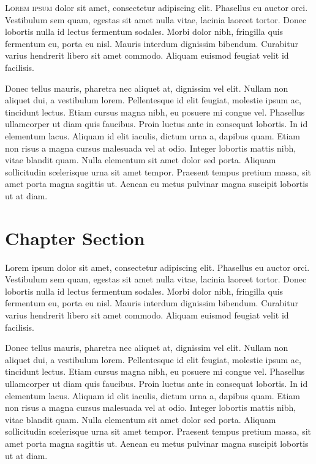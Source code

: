 \lettrine[lines=3]{L}{orem ipsum} dolor sit amet, consectetur adipiscing elit. Phasellus eu auctor orci. Vestibulum sem quam, egestas sit amet nulla vitae, lacinia laoreet tortor. Donec lobortis nulla id lectus fermentum sodales. Morbi dolor nibh, fringilla quis fermentum eu, porta eu nisl. Mauris interdum dignissim bibendum. Curabitur varius hendrerit libero sit amet commodo. Aliquam euismod feugiat velit id facilisis.

Donec tellus mauris, pharetra nec aliquet at, dignissim vel elit. Nullam non aliquet dui, a vestibulum lorem. Pellentesque id elit feugiat, molestie ipsum ac, tincidunt lectus. Etiam cursus magna nibh, eu posuere mi congue vel. Phasellus ullamcorper ut diam quis faucibus. Proin luctus ante in consequat lobortis. In id elementum lacus. Aliquam id elit iaculis, dictum urna a, dapibus quam. Etiam non risus a magna cursus malesuada vel at odio. Integer lobortis mattis nibh, vitae blandit quam. Nulla elementum sit amet dolor sed porta. Aliquam sollicitudin scelerisque urna sit amet tempor. Praesent tempus pretium massa, sit amet porta magna sagittis ut. Aenean eu metus pulvinar magna suscipit lobortis ut at diam.

\section{Chapter Section}
Lorem ipsum dolor sit amet, consectetur adipiscing elit. Phasellus eu auctor orci. Vestibulum sem quam, egestas sit amet nulla vitae, lacinia laoreet tortor. Donec lobortis nulla id lectus fermentum sodales. Morbi dolor nibh, fringilla quis fermentum eu, porta eu nisl. Mauris interdum dignissim bibendum. Curabitur varius hendrerit libero sit amet commodo. Aliquam euismod feugiat velit id facilisis.

Donec tellus mauris, pharetra nec aliquet at, dignissim vel elit. Nullam non aliquet dui, a vestibulum lorem. Pellentesque id elit feugiat, molestie ipsum ac, tincidunt lectus. Etiam cursus magna nibh, eu posuere mi congue vel. Phasellus ullamcorper ut diam quis faucibus. Proin luctus ante in consequat lobortis. In id elementum lacus. Aliquam id elit iaculis, dictum urna a, dapibus quam. Etiam non risus a magna cursus malesuada vel at odio. Integer lobortis mattis nibh, vitae blandit quam. Nulla elementum sit amet dolor sed porta. Aliquam sollicitudin scelerisque urna sit amet tempor. Praesent tempus pretium massa, sit amet porta magna sagittis ut. Aenean eu metus pulvinar magna suscipit lobortis ut at diam.

